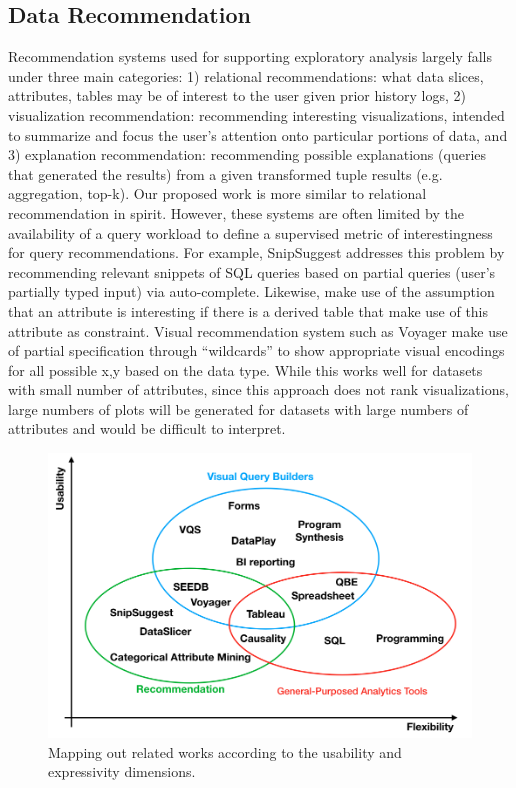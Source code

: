 \documentclass{sig-alternate-05-2015}
\begin{document}
\subsection{Data Recommendation}
Recommendation systems used for supporting exploratory analysis largely falls under three main categories: 1) relational recommendations: what data slices, attributes, tables may be of interest to the user given prior history logs\cite{Khoussainova2010,Alborzi,Pal2017}, 2) visualization recommendation: recommending interesting visualizations, intended to summarize and focus the user's attention onto particular portions of data\cite{Vartak2015,Wongsuphasawat2017}, and 3) explanation recommendation: recommending possible explanations (queries that generated the results) from a given transformed tuple results (e.g. aggregation, top-k)\cite{Chapman2009,Wu2013,Roy2015}. Our proposed work is more similar to relational recommendation in spirit. However, these systems are often limited by the availability of a query workload to define a supervised metric of interestingness for query recommendations\cite{Morton2014,Kamat2016,Khoussainova2010}. For example, SnipSuggest addresses this problem by recommending relevant snippets of SQL queries based on partial queries (user's partially typed input) via auto-complete\cite{Khoussainova2010}. Likewise, \cite{Pal2017} make use of the assumption that an attribute is interesting if there is a derived table that make use of this attribute as constraint. Visual recommendation system such as Voyager make use of partial specification through ``wildcards'' to show appropriate visual encodings for all possible x,y based on the data type. While this works well for datasets with small number of attributes, since this approach does not rank visualizations, large numbers of plots will be generated for datasets with large numbers of attributes and would be difficult to interpret.
\begin{figure}[ht!]\label{related_works}
\includegraphics[width=\linewidth]{figures/related_works.png}
\caption{Mapping out related works according to the usability and expressivity dimensions.}
\end{figure}
\end{document}
